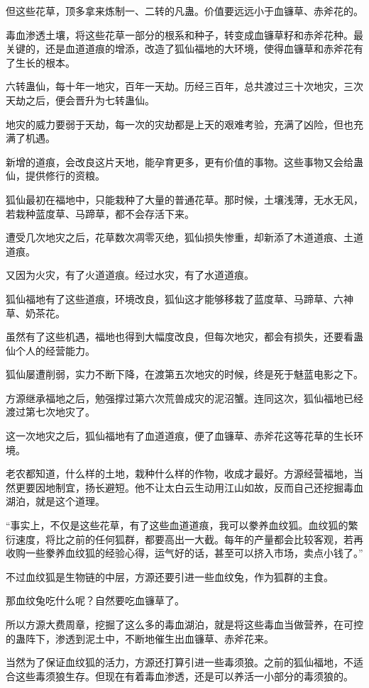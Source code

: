 \begin{this_body}
但这些花草，顶多拿来炼制一、二转的凡蛊。价值要远远小于血镰草、赤斧花的。

毒血渗透土壤，将这些花草一部分的根系和种子，转变成血镰草籽和赤斧花种。最关键的，还是血道道痕的增添，改造了狐仙福地的大环境，使得血镰草和赤斧花有了生长的根本。

六转蛊仙，每十年一地灾，百年一天劫。历经三百年，总共渡过三十次地灾，三次天劫之后，便会晋升为七转蛊仙。

地灾的威力要弱于天劫，每一次的灾劫都是上天的艰难考验，充满了凶险，但也充满了机遇。

新增的道痕，会改良这片天地，能孕育更多，更有价值的事物。这些事物又会给蛊仙，提供修行的资粮。

狐仙最初在福地中，只能栽种了大量的普通花草。那时候，土壤浅薄，无水无风，若栽种蓝度草、马蹄草，都不会存活下来。

遭受几次地灾之后，花草数次凋零灭绝，狐仙损失惨重，却新添了木道道痕、土道道痕。

又因为火灾，有了火道道痕。经过水灾，有了水道道痕。

狐仙福地有了这些道痕，环境改良，狐仙这才能够移栽了蓝度草、马蹄草、六神草、奶茶花。

虽然有了这些机遇，福地也得到大幅度改良，但每次地灾，都会有损失，还要看蛊仙个人的经营能力。

狐仙屡遭削弱，实力不断下降，在渡第五次地灾的时候，终是死于魅蓝电影之下。

方源继承福地之后，勉强撑过第六次荒兽成灾的泥沼蟹。连同这次，狐仙福地已经渡过第七次地灾了。

这一次地灾之后，狐仙福地有了血道道痕，便了血镰草、赤斧花这等花草的生长环境。

老农都知道，什么样的土地，栽种什么样的作物，收成才最好。方源经营福地，当然更要因地制宜，扬长避短。他不让太白云生动用江山如故，反而自己还挖掘毒血湖泊，就是这个道理。

“事实上，不仅是这些花草，有了这些血道道痕，我可以豢养血纹狐。血纹狐的繁衍速度，将比之前的任何狐群，都要高出一大截。每年的产量都会比较客观，若再收购一些豢养血纹狐的经验心得，运气好的话，甚至可以挤入市场，卖点小钱了。”

不过血纹狐是生物链的中层，方源还要引进一些血纹兔，作为狐群的主食。

那血纹兔吃什么呢？自然要吃血镰草了。

所以方源大费周章，挖掘了这么多的毒血湖泊，就是将这些毒血当做营养，在可控的蛊阵下，渗透到泥土中，不断地催生出血镰草、赤斧花来。

当然为了保证血纹狐的活力，方源还打算引进一些毒须狼。之前的狐仙福地，不适合这些毒须狼生存。但现在有着毒血渗透，还是可以养活一小部分的毒须狼的。


\end{this_body}

